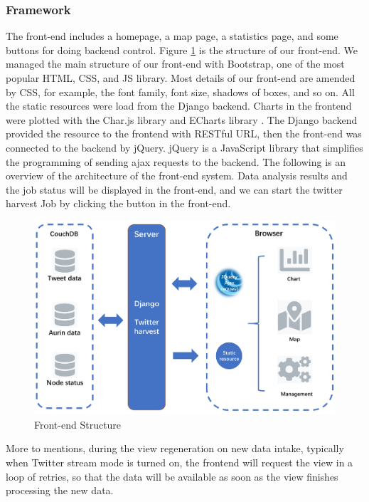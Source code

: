\subsubsection{Framework}
The front-end includes a homepage, a map page, a statistics page, and some buttons for doing backend control. Figure \ref{frontends} is the structure of our front-end. We managed the main structure of our front-end with Bootstrap, one of the most popular HTML, CSS, and JS library. Most details of our front-end are amended by CSS, for example, the font family, font size, shadows of boxes, and so on. All the static resources were load from the Django backend. Charts in the frontend were plotted with the Char.js library and ECharts library \cite{LI2018136}. The Django backend provided the resource to the frontend with RESTful URL, then the front-end was connected to the backend by jQuery. jQuery is a JavaScript library that simplifies the programming of sending ajax requests to the backend. The following is an overview of the architecture of the front-end system. Data analysis results and the job status will be displayed in the front-end, and we can start the twitter harvest Job by clicking the button in the front-end. 
\begin{figure}
\centerline{\includegraphics[width=6in]{Figures/FrontendStructure.JPG}}
\caption{Front-end Structure\label{frontends}}
\end{figure}

More to mentions, during the view regeneration on new data intake, typically when Twitter stream mode is turned on, the frontend will request the view in a loop of retries, so that the data will be available as soon as the view finishes processing the new data. 

